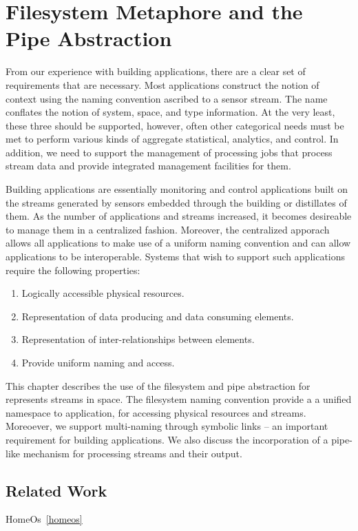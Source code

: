 \chapter{Filesystem Metaphore and the Pipe Abstraction}
From our experience with building applications, there are a clear set of requirements that are necessary.  Most applications
construct the notion of context using the naming convention ascribed to a sensor stream.  The name conflates the notion of system,
space, and type information.  At the very least, these three should be supported, however, often other categorical needs must be
met to perform various kinds of aggregate statistical, analytics, and control.  In addition, we need to support the management of
processing jobs that process stream data and provide integrated management facilities for them.

Building applications are essentially monitoring and control applications built on the streams generated by sensors embedded through
the building or distillates of them.  As the number of applications and streams increased, it becomes desireable to manage them 
in a centralized fashion.  Moreover, the centralized apporach allows all applications to make use of a uniform naming convention and
can allow applications to be interoperable.  Systems that wish to support such applications require the following properties:

\begin{enumerate}
\item Logically accessible physical resources.
\item Representation of data producing and data consuming elements.
\item Representation of inter-relationships between elements.
\item Provide uniform naming and access.
\end{enumerate}

This chapter describes the use of the filesystem and pipe abstraction for represents streams in space.  The filesystem naming convention
provide a a unified namespace to application, for accessing physical resources and streams.  Moreoever, we support multi-naming through
symbolic links -- an important requirement for building applications.  We also discuss the incorporation of a pipe-like mechanism for 
processing streams and their output.


\section{Related Work}
HomeOs~\ref{homeos}



